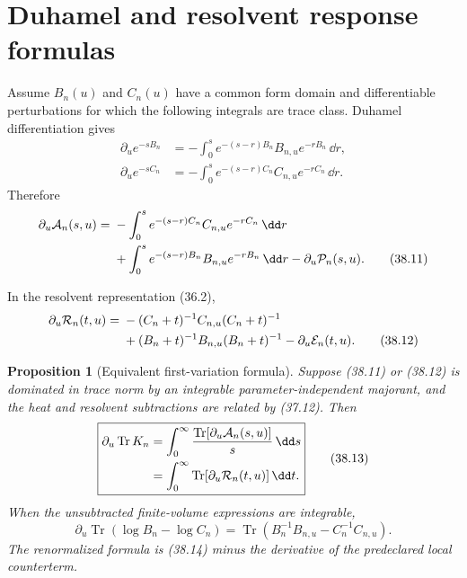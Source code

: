 \documentclass[11pt]{article}
\newtheorem{proposition}[theorem]{Proposition}
\theoremstyle{remark}
\begin{document}
\section{Duhamel and resolvent response formulas}

Assume \(B_n(u)\) and \(C_n(u)\) have a common form domain and
differentiable perturbations for which the following integrals are
trace class.  Duhamel differentiation gives
\[
 \begin{split}
 \partial_u e^{-sB_n}
 &=-\int_0^s e^{-(s-r)B_n}B_{n,u}e^{-rB_n}\,\dd r,\\
 \partial_u e^{-sC_n}
 &=-\int_0^s e^{-(s-r)C_n}C_{n,u}e^{-rC_n}\,\dd r.
                                                               \tag{38.10}
 \end{split}
\]
Therefore
\[
 \begin{split}
 \partial_u{\cal A}_n(s,u)
={}&-\int_0^s e^{-(s-r)C_n}C_{n,u}e^{-rC_n}\,\dd r\\
 &+\int_0^s e^{-(s-r)B_n}B_{n,u}e^{-rB_n}\,\dd r
 -\partial_u{\cal P}_n(s,u).                            \tag{38.11}
 \end{split}
\]

In the resolvent representation (36.2),
\[
 \begin{split}
 \partial_u{\cal R}_n(t,u)
={}&-(C_n+t)^{-1}C_{n,u}(C_n+t)^{-1}\\
 &+(B_n+t)^{-1}B_{n,u}(B_n+t)^{-1}
 -\partial_u{\cal E}_n(t,u).                            \tag{38.12}
 \end{split}
\]

\begin{proposition}[Equivalent first-variation formula]
\label{prop:v15v38-response}
Suppose (38.11) or (38.12) is dominated in trace norm by an
integrable parameter-independent majorant, and the heat and
resolvent subtractions are related by (37.12).  Then
\[
 \boxed{
 \begin{split}
 \partial_u\operatorname{Tr}K_n
 &=
 \int_0^\infty\frac{\operatorname{Tr}
       [\partial_u{\cal A}_n(s,u)]}{s}\,\dd s\\
 &=
 \int_0^\infty
       \operatorname{Tr}[\partial_u{\cal R}_n(t,u)]\,\dd t.
 \end{split}}                                            \tag{38.13}
\]
When the unsubtracted finite-volume expressions are integrable,
\[
 \partial_u\operatorname{Tr}(\log B_n-\log C_n)
 =
 \operatorname{Tr}(B_n^{-1}B_{n,u}
                   -C_n^{-1}C_{n,u}).                   \tag{38.14}
\]
The renormalized formula is (38.14) minus the derivative of the
predeclared local counterterm.
\end{proposition}
\end{document}
